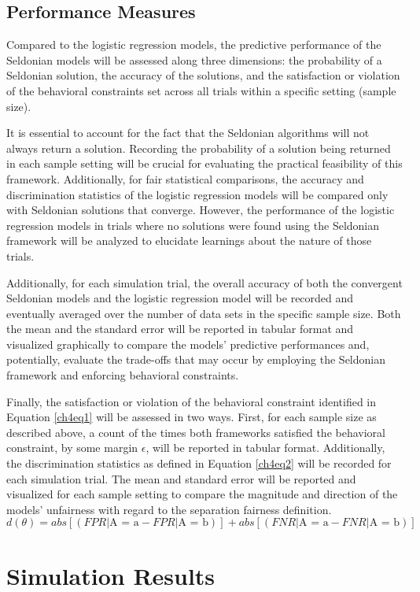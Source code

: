 \documentclass[12pt, twoside]{amherstthesis}
\begin{document}
\hypertarget{performancemeasures}{%
\subsection{Performance Measures}\label{performancemeasures}}

Compared to the logistic regression models, the predictive performance of the Seldonian models will be assessed along three dimensions: the probability of a Seldonian solution, the accuracy of the solutions, and the satisfaction or violation of the behavioral constraints set across all trials within a specific setting (sample size).

It is essential to account for the fact that the Seldonian algorithms will not always return a solution. Recording the probability of a solution being returned in each sample setting will be crucial for evaluating the practical feasibility of this framework. Additionally, for fair statistical comparisons, the accuracy and discrimination statistics of the logistic regression models will be compared only with Seldonian solutions that converge. However, the performance of the logistic regression models in trials where no solutions were found using the Seldonian framework will be analyzed to elucidate learnings about the nature of those trials.

Additionally, for each simulation trial, the overall accuracy of both the convergent Seldonian models and the logistic regression model will be recorded and eventually averaged over the number of data sets in the specific sample size. Both the mean and the standard error will be reported in tabular format and visualized graphically to compare the models' predictive performances and, potentially, evaluate the trade-offs that may occur by employing the Seldonian framework and enforcing behavioral constraints.

Finally, the satisfaction or violation of the behavioral constraint identified in Equation \ref{ch4eq1} will be assessed in two ways. First, for each sample size as described above, a count of the times both frameworks satisfied the behavioral constraint, by some margin \(\epsilon\), will be reported in tabular format. Additionally, the discrimination statistics as defined in Equation \ref{ch4eq2} will be recorded for each simulation trial. The mean and standard error will be reported and visualized for each sample setting to compare the magnitude and direction of the models' unfairness with regard to the separation fairness definition.
\begin{equation}
\label{ch4eq2}
d(\theta) = abs[(FPR | \text{A = a} - FPR | \text{A = b})] + abs[(FNR | \text{A = a} - FNR | \text{A = b})]
\end{equation}
\hypertarget{sim-results}{%
\section{Simulation Results}\label{sim-results}}
\end{document}

